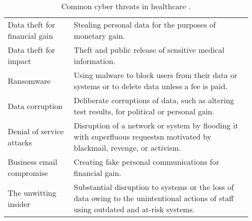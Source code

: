 \documentclass{IEEEtran}
\begin{document}
\begin{table*}[tbh]
	\caption{Common cyber threats in healthcare \cite{martin2017cybersecurity}.}
	\centering
	\begin{tabular}{l l}
		\hline\hline
	Data theft for financial gain & Stealing personal data for the purposes of monetary gain. \\
	Data theft for impact & Theft and public release of sensitive medical information. \\
	Ransomware & Using malware to block users from their data or systems or to delete data unless a fee is paid. \\
	Data corruption & Deliberate corruptions of data, such as altering test results, for political or personal gain. \\
	Denial of service attacks & Disruption of a network or system by flooding it with superfluous requestsn motivated by blackmail, revenge, or activism. \\
	Business email compromise & Creating fake personal communications for financial gain.\\ 
	The unwitting insider & Substantial disruption to systems or the loss of data owing to the unintentional actions of staff using outdated and at-risk systems. \\
	\hline
	\end{tabular}
	\label{tab:common}
\end{table*}
\end{document}
